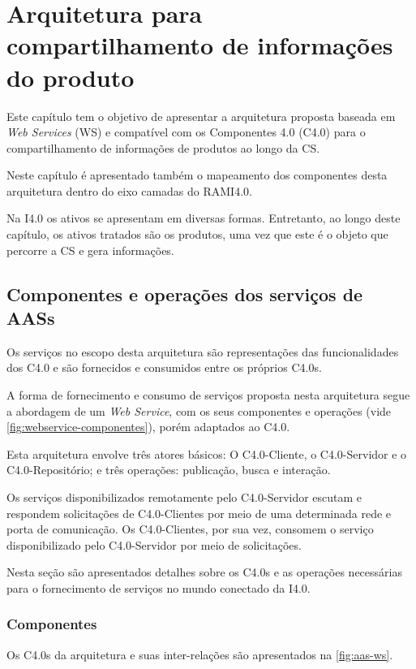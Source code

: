 \chapter{Arquitetura para compartilhamento de informações do produto}
\label{cha:arquitetura}

Este capítulo tem o objetivo de apresentar a arquitetura proposta baseada em \textit{Web Services} (WS) e compatível com os Componentes 4.0 (C4.0) para o compartilhamento de informações de produtos ao longo da CS.

Neste capítulo é apresentado também o mapeamento dos componentes desta arquitetura dentro do eixo camadas do RAMI4.0.

Na I4.0 os ativos se apresentam em diversas formas. Entretanto, ao longo deste capítulo, os ativos tratados são os produtos, uma vez que este é o objeto que percorre a CS e gera informações.

\section{Componentes e operações dos serviços de AASs}
\label{sec:componentes-e-operacoes}

Os serviços no escopo desta arquitetura são representações das funcionalidades dos C4.0 e são fornecidos e consumidos entre os próprios C4.0s.

A forma de fornecimento e consumo de serviços proposta nesta arquitetura segue a abordagem de um \textit{Web Service}, com os seus componentes e operações (vide \autoref{fig:webservice-componentes}), porém adaptados ao C4.0.

Esta arquitetura envolve três atores básicos: O C4.0-Cliente, o C4.0-Servidor e o C4.0-Repositório; e três operações: publicação, busca e interação.

Os serviços disponibilizados remotamente pelo C4.0-Servidor escutam e respondem solicitações de C4.0-Clientes por meio de uma determinada rede e porta de comunicação. Os C4.0-Clientes, por sua vez, consomem o serviço disponibilizado pelo C4.0-Servidor por meio de solicitações.

Nesta seção são apresentados detalhes sobre os C4.0s e as operações necessárias para o fornecimento de serviços no mundo conectado da I4.0.

\subsection{Componentes}

Os C4.0s da arquitetura e suas inter-relações são apresentados na \autoref{fig:aas-ws}.

